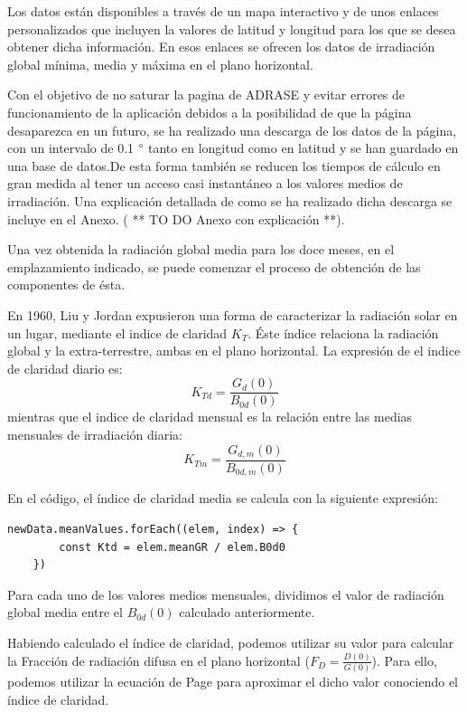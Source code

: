Los datos están disponibles a través de un mapa interactivo y de unos enlaces personalizados que incluyen la valores de latitud y longitud para los que se desea obtener dicha información. En esos enlaces se ofrecen los datos de irradiación global mínima, media y máxima en el plano horizontal.

Con el objetivo de no saturar la pagina de ADRASE y evitar errores de funcionamiento de la aplicación debidos a la posibilidad de que la página desaparezca en un futuro, se ha realizado una descarga de los datos de la página, con un intervalo de 0.1 $\degree$ tanto en longitud como en latitud y se han guardado en una base de datos.De esta forma también se reducen los tiempos de cálculo en gran medida al tener un acceso casi instantáneo a los valores medios de irradiación. 
Una explicación detallada de como se ha realizado dicha descarga se incluye en el Anexo. ( ** TO DO Anexo con explicación **).

Una vez obtenida la radiación global media para los doce meses, en el emplazamiento indicado, se puede comenzar el proceso de obtención de las componentes de ésta.

En 1960, Liu y Jordan \cite{lj60} expusieron una forma de caracterizar la radiación solar en un lugar, mediante el indice de claridad $K_T$. Éste índice relaciona la radiación global y la extra-terrestre, ambas en el plano horizontal. La expresión de el indice de claridad diario es:\\

\begin{equation}
\label{eqn:ktd}
K_{Td} = \frac{G_d(0)}{B_{0d}(0)}
\end{equation}
mientras que el indice de claridad mensual es la relación entre las medias mensuales de irradiación diaria:
\begin{equation}
K_{Tm} = \frac{G_{d,m}(0)}{B_{0d,m}(0)}
\end{equation}

En el código, el índice de claridad media se calcula con la siguiente expresión:
\begin{lstlisting}[style=ES6, caption={Índice de claridad diario}]
	newData.meanValues.forEach((elem, index) => {
		const Ktd = elem.meanGR / elem.B0d0
	})
\end{lstlisting}
Para cada uno de los valores medios mensuales, dividimos el valor de radiación global media entre el $B_{0d}(0)$ calculado anteriormente.

Habiendo calculado el índice de claridad, podemos utilizar su valor para calcular la Fracción de radiación difusa en el plano horizontal ($F_D=\frac{D(0)}{G(0)}$). Para ello, podemos utilizar la ecuación de Page para aproximar el dicho valor conociendo el índice de claridad.

